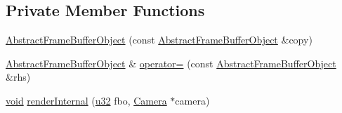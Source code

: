 \subsection*{Private Member Functions}
\begin{DoxyCompactItemize}
\item 
\mbox{\hyperlink{classnjli_1_1_abstract_frame_buffer_object_ac2533319b6631e307c44d0b68f46d9ea}{Abstract\+Frame\+Buffer\+Object}} (const \mbox{\hyperlink{classnjli_1_1_abstract_frame_buffer_object}{Abstract\+Frame\+Buffer\+Object}} \&copy)
\item 
\mbox{\hyperlink{classnjli_1_1_abstract_frame_buffer_object}{Abstract\+Frame\+Buffer\+Object}} \& \mbox{\hyperlink{classnjli_1_1_abstract_frame_buffer_object_a2b192e82cda52d9dc2b4983581f6ee2c}{operator=}} (const \mbox{\hyperlink{classnjli_1_1_abstract_frame_buffer_object}{Abstract\+Frame\+Buffer\+Object}} \&rhs)
\item 
\mbox{\hyperlink{_thread_8h_af1e856da2e658414cb2456cb6f7ebc66}{void}} \mbox{\hyperlink{classnjli_1_1_abstract_frame_buffer_object_ae5861927463cc57cdd8214a4b957a68d}{render\+Internal}} (\mbox{\hyperlink{_util_8h_a10e94b422ef0c20dcdec20d31a1f5049}{u32}} fbo, \mbox{\hyperlink{classnjli_1_1_camera}{Camera}} $\ast$camera)
\end{DoxyCompactItemize}
